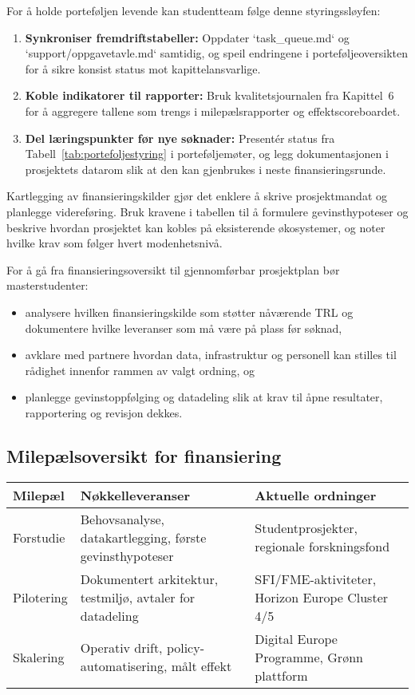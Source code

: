 For å holde porteføljen levende kan studentteam følge denne styringssløyfen:
\begin{enumerate}
    \item \textbf{Synkroniser fremdriftstabeller:} Oppdater `task_queue.md` og `support/oppgavetavle.md` samtidig, og speil endringene i porteføljeoversikten for å sikre konsist status mot kapittelansvarlige.
    \item \textbf{Koble indikatorer til rapporter:} Bruk kvalitetsjournalen fra Kapittel~6 for å aggregere tallene som trengs i milepælsrapporter og effektscoreboardet.
    \item \textbf{Del læringspunkter før nye søknader:} Presentér status fra Tabell~\ref{tab:portefoljestyring} i porteføljemøter, og legg dokumentasjonen i prosjektets datarom slik at den kan gjenbrukes i neste finansieringsrunde.
\end{enumerate}

Kartlegging av finansieringskilder gjør det enklere å skrive prosjektmandat og planlegge videreføring. Bruk kravene i tabellen til å formulere gevinsthypoteser og beskrive hvordan prosjektet kan kobles på eksisterende økosystemer, og noter hvilke krav som følger hvert modenhetsnivå.\citep{rcn2024programkatalog,eu2024digitaltwinroadmap,innovasjon2024gronnplattform}

For å gå fra finansieringsoversikt til gjennomførbar prosjektplan bør masterstudenter:
\begin{itemize}
    \item analysere hvilken finansieringskilde som støtter nåværende TRL og dokumentere hvilke leveranser som må være på plass før søknad,
    \item avklare med partnere hvordan data, infrastruktur og personell kan stilles til rådighet innenfor rammen av valgt ordning, og
    \item planlegge gevinstoppfølging og datadeling slik at krav til åpne resultater, rapportering og revisjon dekkes.
\end{itemize}

\subsection*{Milepælsoversikt for finansiering}
\begin{table}[h]
    \centering
    \begin{tabular}{p{3.0cm}p{5.0cm}p{4.2cm}}
        \toprule
        Milepæl & Nøkkelleveranser & Aktuelle ordninger \\
        \midrule
        Forstudie & Behovsanalyse, datakartlegging, første gevinsthypoteser & Studentprosjekter, regionale forskningsfond \\
        Pilotering & Dokumentert arkitektur, testmiljø, avtaler for datadeling & SFI/FME-aktiviteter, Horizon Europe Cluster 4/5 \\
        Skalering & Operativ drift, policy-automatisering, målt effekt & Digital Europe Programme, Grønn plattform \\
        \bottomrule
    \end{tabular}
\end{table}

